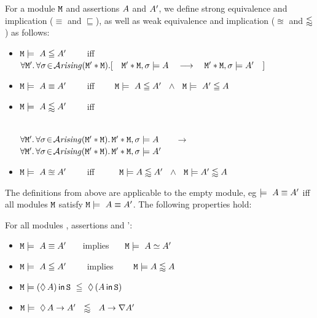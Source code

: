 \begin{definition}
\label{def:impl:equiv}
\noindent
For a module ${\mbox{\tt{M}}}$  and assertions $A$  and $A'$, we define strong equivalence and implication ($\equiv$ and $\sqsubseteq$), as well
as   weak equivalence and implication ($\approxeq$ and $\lessapprox$)  as follows:


 \begin{itemize}
\item
${\mbox{\tt{M}}}   \models\  A \leqq A'$  \ \ \ \ iff \ \ \ \
$\forall \M'.\, \forall \sigma\!\in\!\Arising(\M'*\M).[\ \ \  \M'*\M, \sigma \models \A \  \ \  \longrightarrow\  \ \  \M'*\M, \sigma \models \A'\ \ \ ]$
 \item
${\mbox{\tt{M}}}   \models\  A \equiv A'$ \ \ \ \ iff \ \ \ \
${\mbox{\tt{M}}}   \models\  A \leqq A'\ \  \wedge \ \  {\mbox{\tt{M}}}   \models\  A' \leqq A$
\item
${\mbox{\tt{M}}}   \models\   A \lessapprox A'$  \ \ \ \ iff \\ \ \ \ \ \ \
\strut  \hspace{1cm}  $\forall {\mbox{\tt{M}}}'.\, \forall \sigma\!\in\!{\mathcal{A}}\textrm{\textit{rising}}({\mbox{\tt{M}}}'*{\mbox{\tt{M}}}).\,{\mbox{\tt{M}}}'*{\mbox{\tt{M}}}, \sigma \models A$ \  \ \  $\longrightarrow$\  \ \
$\forall {\mbox{\tt{M}}}'.\, \forall \sigma\!\in\!{\mathcal{A}}\textrm{\textit{rising}}({\mbox{\tt{M}}}'*{\mbox{\tt{M}}}).\,{\mbox{\tt{M}}}'*{\mbox{\tt{M}}}, \sigma \models A'$
\item
${\mbox{\tt{M}}}   \models\  A \approxeq A'$   \ \ \ \ iff \ \ \ \ \
$ {\mbox{\tt{M}}}  \models  A \lessapprox A' \   \ \wedge\   \  {\mbox{\tt{M}}}  \models  A' \lessapprox A$
 \end{itemize}
\end{definition}

The definitions from above are applicable to the empty module, eg  $\models\  A \equiv A'$ iff   all modules ${\mbox{\tt{M}}}$ satisfy ${\mbox{\tt{M}}} \models\  A \equiv A'$.
The following properties hold:

\begin{lemma}
For all modules \M, assertions \A and \A':

 \begin{itemize}
 \item
${\mbox{\tt{M}}}   \models\  A \equiv A'$  \ \ \ implies \ \ \  ${\mbox{\tt{M}}}   \models\  A \simeq A'$
\item
${\mbox{\tt{M}}}   \models\  A \leqq A'$  \ \ \ \ implies  \ \ \ \
${\mbox{\tt{M}}} \models A \lessapprox A$
\item
$\M \models   \Using{(\Future{\A})}{\prg{S}}\ \strongImplies\ \Future{(\Using{\A} }{\prg{S}})$
\item
$ {\mbox{\tt{M}}} \models\  \lozenge\, A\rightarrow A' \  \  \lessapprox \ \ A\rightarrow\nabla A'$
 \end{itemize}
\end{lemma}

